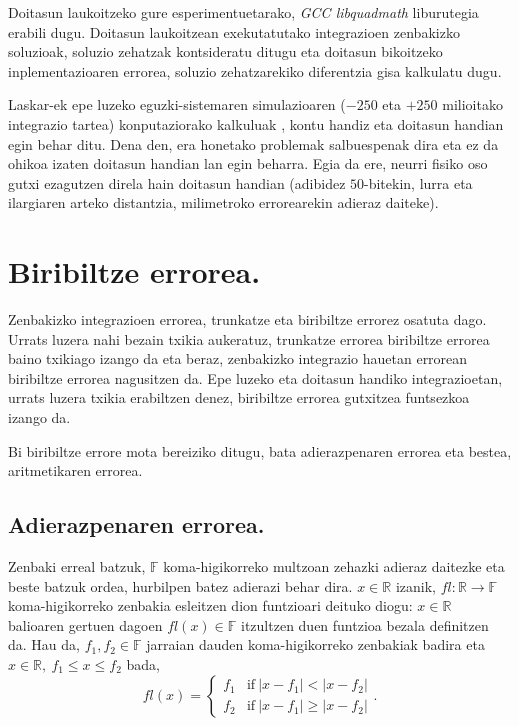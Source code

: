 Doitasun laukoitzeko gure esperimentuetarako, \emph{GCC libquadmath} liburutegia \cite{libquad} erabili dugu. Doitasun laukoitzean exekutatutako integrazioen zenbakizko soluzioak, soluzio zehatzak kontsideratu ditugu eta  doitasun bikoitzeko inplementazioaren errorea, soluzio zehatzarekiko diferentzia gisa kalkulatu dugu. 

Laskar-ek epe luzeko eguzki-sistemaren simulazioaren ($-250$ eta $+250$ milioitako integrazio tartea) konputaziorako kalkuluak \cite{Laskar2011}, kontu handiz eta doitasun handian egin behar ditu. Dena den, era honetako problemak salbuespenak dira eta ez da ohikoa izaten doitasun handian lan egin beharra. Egia da ere, neurri fisiko oso gutxi ezagutzen direla  hain doitasun handian (adibidez $50$-bitekin, lurra eta ilargiaren arteko distantzia, milimetroko errorearekin adieraz daiteke).  


\section{Biribiltze errorea.}

Zenbakizko integrazioen errorea, trunkatze eta biribiltze errorez osatuta dago. Urrats luzera nahi bezain txikia aukeratuz, trunkatze errorea biribiltze errorea baino txikiago izango da eta beraz, zenbakizko integrazio hauetan errorean biribiltze errorea nagusitzen da. Epe luzeko eta doitasun handiko integrazioetan, urrats luzera txikia erabiltzen denez, biribiltze errorea gutxitzea funtsezkoa izango da.     

Bi biribiltze errore mota bereiziko ditugu, bata adierazpenaren errorea eta bestea, aritmetikaren errorea.  

\subsection*{Adierazpenaren errorea.} 

Zenbaki erreal batzuk, $\mathbb{F}$ koma-higikorreko multzoan zehazki adieraz daitezke eta beste batzuk ordea, hurbilpen batez adierazi behar dira. $x \in \mathbb{R}$ izanik, $fl: \mathbb{R} \rightarrow \mathbb{F}$ koma-higikorreko zenbakia esleitzen dion funtzioari deituko diogu:  $x \in \mathbb{R}$ balioaren gertuen dagoen  $fl(x) \in \mathbb{F}$ itzultzen duen funtzioa bezala definitzen da. Hau da, $f_1,f_2 \in \mathbb{F}$ jarraian dauden koma-higikorreko zenbakiak  badira eta $x \in \mathbb{R}, \ f_1\leqslant x \leqslant f_2$ bada,
\begin{equation*}
fl(x)=
\left\{
        \begin{array}{lc}
        f_1 & \mathrm{if} \ |x-f_1| < |x-f_2| \\
        f_2 & \mathrm{if} \ |x-f_1| \geqslant |x-f_2| 
        \end{array}.
\right.
\end{equation*}  

